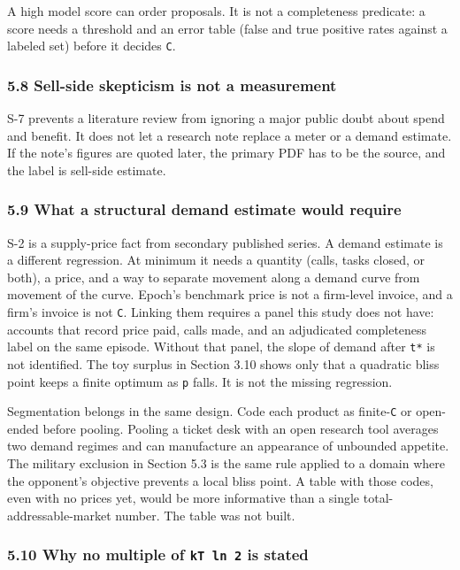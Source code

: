 \documentclass[
  10pt,
]{article}
\begin{document}
A high model score can order proposals. It is not a completeness
predicate: a score needs a threshold and an error table (false and true
positive rates against a labeled set) before it decides \texttt{C}.

\subsubsection{5.8 Sell-side skepticism is not a
measurement}\label{sell-side-skepticism-is-not-a-measurement}

S-7 prevents a literature review from ignoring a major public doubt
about spend and benefit. It does not let a research note replace a meter
or a demand estimate. If the note's figures are quoted later, the
primary PDF has to be the source, and the label is sell-side estimate.

\subsubsection{5.9 What a structural demand estimate would
require}\label{what-a-structural-demand-estimate-would-require}

S-2 is a supply-price fact from secondary published series. A demand
estimate is a different regression. At minimum it needs a quantity
(calls, tasks closed, or both), a price, and a way to separate movement
along a demand curve from movement of the curve. Epoch's benchmark price
is not a firm-level invoice, and a firm's invoice is not \texttt{C}.
Linking them requires a panel this study does not have: accounts that
record price paid, calls made, and an adjudicated completeness label on
the same episode. Without that panel, the slope of demand after
\texttt{t*} is not identified. The toy surplus in Section 3.10 shows
only that a quadratic bliss point keeps a finite optimum as \texttt{p}
falls. It is not the missing regression.

Segmentation belongs in the same design. Code each product as
finite-\texttt{C} or open-ended before pooling. Pooling a ticket desk
with an open research tool averages two demand regimes and can
manufacture an appearance of unbounded appetite. The military exclusion
in Section 5.3 is the same rule applied to a domain where the opponent's
objective prevents a local bliss point. A table with those codes, even
with no prices yet, would be more informative than a single
total-addressable-market number. The table was not built.

\subsubsection{\texorpdfstring{5.10 Why no multiple of
\texttt{kT\ ln\ 2} is
stated}{5.10 Why no multiple of kT ln 2 is stated}}\label{why-no-multiple-of-kt-ln-2-is-stated}
\end{document}
